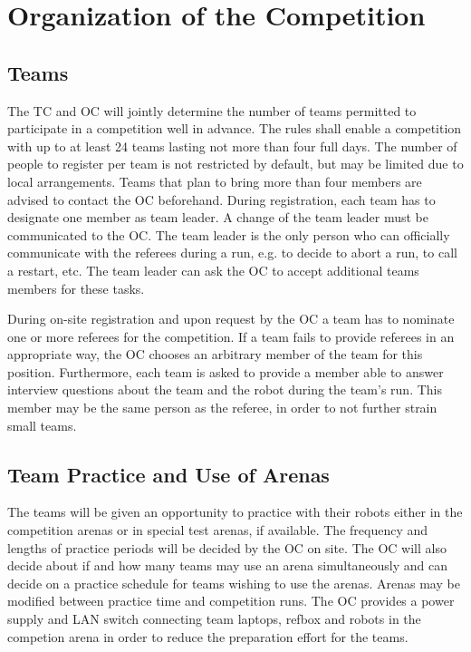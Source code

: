 
\section{Organization of the Competition}\label{sec:organization_of_the_competition}

\subsection{Teams}
The TC and OC will jointly determine the number of teams permitted to participate in a competition well in advance. The rules shall enable a competition with up to at least 24 teams lasting not more than four full days.
The number of people to register per team is not restricted by default, but may be limited due to local arrangements. Teams that plan to bring more than four members are advised to contact the OC beforehand.
During registration, each team has to designate one member as team leader. A change of the team leader must be communicated to the OC. The team leader is the only person who can officially communicate with the referees during a run, e.g. to decide to abort a run, to call a restart, etc. The team leader can ask the OC to accept additional teams members for these tasks.
\par
During on-site registration and upon request by the OC a team has to nominate one or more referees for the competition. If a team fails to provide referees in an appropriate way, the OC chooses an arbitrary member of the team for this position. Furthermore, each team is asked to provide a member able to answer interview questions about the team and the robot during the team's run. This member may be the same person as the referee, in order to not further strain small teams.


\subsection{Team Practice and Use of Arenas}
The teams will be given an opportunity to practice with their robots either in the competition arenas or in special test arenas, if available. The frequency and lengths of practice periods will be decided by the OC on site. The OC will also decide about if and how many teams may use an arena simultaneously and can decide on a practice schedule for teams wishing to use the arenas. Arenas may be modified between practice time and competition runs.
The OC provides a power supply and LAN switch connecting team laptops, refbox and robots in the competion arena in order to reduce
the preparation effort for the teams.

